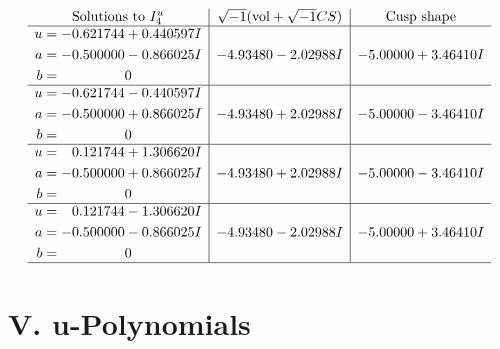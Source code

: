 \documentclass[1p]{elsarticle_modified}
\theoremstyle{definition}
\newcommand{\I}{\sqrt{-1}}
\begin{document}
$$\begin{array}{c|c|c}  
\text{Solutions to }I^u_{4}& \I (\text{vol} + \sqrt{-1}CS) & \text{Cusp shape}\\
 \hline 
\begin{aligned}
u &= -0.621744 + 0.440597 I \\
a &= -0.500000 - 0.866025 I \\
b &= \phantom{-0.000000 } 0\end{aligned}
 & -4.93480 - 2.02988 I & -5.00000 + 3.46410 I \\ \hline\begin{aligned}
u &= -0.621744 - 0.440597 I \\
a &= -0.500000 + 0.866025 I \\
b &= \phantom{-0.000000 } 0\end{aligned}
 & -4.93480 + 2.02988 I & -5.00000 - 3.46410 I \\ \hline\begin{aligned}
u &= \phantom{-}0.121744 + 1.306620 I \\
a &= -0.500000 + 0.866025 I \\
b &= \phantom{-0.000000 } 0\end{aligned}
 & -4.93480 + 2.02988 I & -5.00000 - 3.46410 I \\ \hline\begin{aligned}
u &= \phantom{-}0.121744 - 1.306620 I \\
a &= -0.500000 - 0.866025 I \\
b &= \phantom{-0.000000 } 0\end{aligned}
 & -4.93480 - 2.02988 I & -5.00000 + 3.46410 I\\
 \hline 
 \end{array}$$\newpage
\newpage\renewcommand{\arraystretch}{1}
\centering \section*{ V. u-Polynomials}
\end{document}
